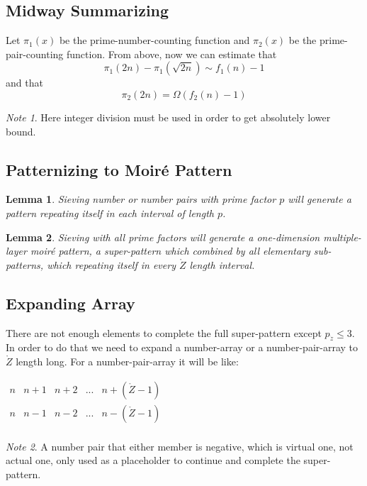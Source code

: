 \documentclass[twocolumn]{article}%
\newtheorem{lem}{Lemma}
\theoremstyle{definition}
\theoremstyle{remark}
\newtheorem*{note}{Note}
\begin{document}
\subsection*{Midway Summarizing}

Let $\pi_1(x)$ be the prime-number-counting function and $\pi_2(x)$ be the prime-pair-counting function.
From above, now we can estimate that
\begin{equation}
\pi_1(2n)-\pi_1(\sqrt{2n}) \sim f_1(n)-1
\end{equation}
and that
\begin{equation}
\pi_2(2n) = \Omega\left(f_2(n)-1\right)
\end{equation}
\begin{note}	
	Here integer division must be used in order to get absolutely lower bound.
\end{note}

\subsection*{Patternizing to Moiré Pattern}

\begin{lem}\label{lemPatternp}
Sieving number or number pairs with prime factor $p$ will generate a pattern repeating itself in each interval of length $p$.
\end{lem}
\begin{lem}\label{lemPatternAll}
	Sieving with all prime factors will generate a one-dimension multiple-layer moiré pattern, a super-pattern which combined by all elementary sub-patterns, which repeating itself in every $\mathring{Z}$ length interval.
\end{lem}
\subsection*{Expanding Array}

There are not enough elements to complete the full super-pattern except $p_{\dot{z}} \le 3$. 
In order to do that we need to expand a number-array or a number-pair-array to $\mathring{Z}$ length long. For a number-pair-array it will be like:
\begin{center}
	\(\begin{array}{ccccccccccc}
	n & n+1 & n+2 & ... & n+(\mathring{Z}-1) \\
	n & n-1 & n-2 & ... & n-(\mathring{Z}-1) \\
	\end{array}\)
\end{center}
\begin{note}	
	A number pair that either member is negative, which is virtual one, not actual one, only used as a placeholder to continue and complete the super-pattern.
\end{note}
\end{document}
